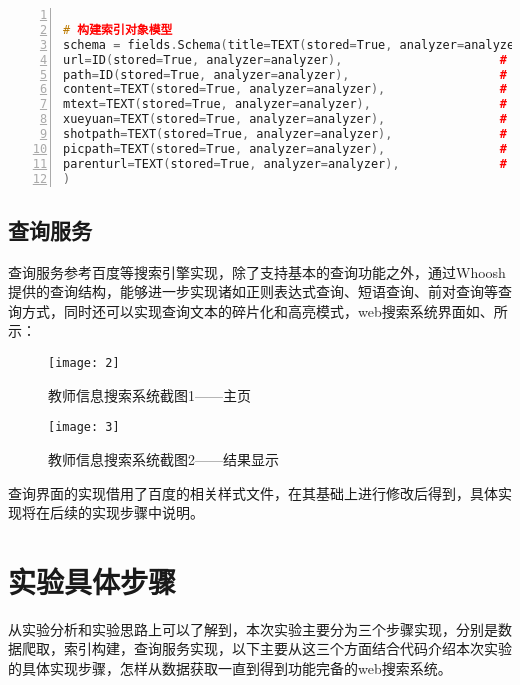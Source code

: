 \documentclass[lang=cn,11pt]{elegantpaper}
\begin{document}
\begin{lstlisting}[language = C++, numbers=left, 
numberstyle=\tiny,keywordstyle=\color{blue!70},
commentstyle=\color{red!50!green!50!blue!50},frame=shadowbox,
rulesepcolor=\color{red!20!green!20!blue!20},basicstyle=\ttfamily]

# 构建索引对象模型
schema = fields.Schema(title=TEXT(stored=True, analyzer=analyzer),                  # 姓名
url=ID(stored=True, analyzer=analyzer),                      # 链接
path=ID(stored=True, analyzer=analyzer),                     # 主页内容保存路径
content=TEXT(stored=True, analyzer=analyzer),                # 主页内容
mtext=TEXT(stored=True, analyzer=analyzer),                  # 锚文本
xueyuan=TEXT(stored=True, analyzer=analyzer),                # 学院
shotpath=TEXT(stored=True, analyzer=analyzer),               # 快照路径
picpath=TEXT(stored=True, analyzer=analyzer),                # 照片路径，如果不存在则为#
parenturl=TEXT(stored=True, analyzer=analyzer),              # 父亲链接
)
\end{lstlisting}

\subsection{查询服务}

查询服务参考百度等搜索引擎实现，除了支持基本的查询功能之外，通过Whoosh提供的查询结构，能够进一步实现诸如正则表达式查询、短语查询、前对查询等查询方式，同时还可以实现查询文本的碎片化和高亮模式，web搜索系统界面如、所示：

\begin{figure}[htbp]
	\centering
	\texttt{[image: 2]}
	\caption{教师信息搜索系统截图1——主页 \label{fig:2}}
\end{figure}

\begin{figure}[htbp]
	\centering
	\texttt{[image: 3]}
	\caption{教师信息搜索系统截图2——结果显示 \label{fig:3}}
\end{figure}

查询界面的实现借用了百度的相关样式文件，在其基础上进行修改后得到，具体实现将在后续的实现步骤中说明。

\section{实验具体步骤}

从实验分析和实验思路上可以了解到，本次实验主要分为三个步骤实现，分别是数据爬取，索引构建，查询服务实现，以下主要从这三个方面结合代码介绍本次实验的具体实现步骤，怎样从数据获取一直到得到功能完备的web搜索系统。
\end{document}
